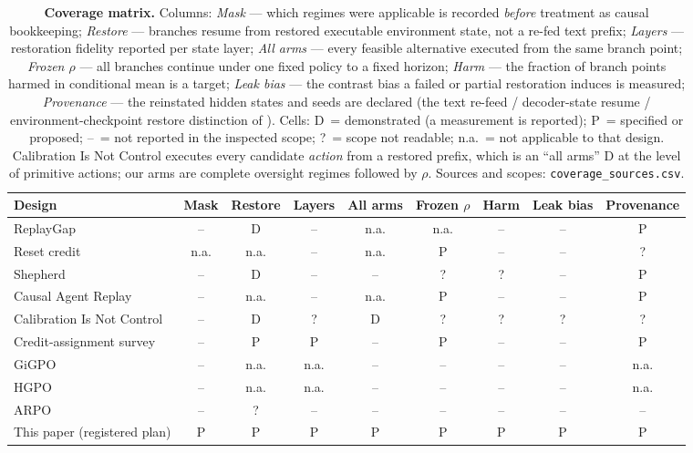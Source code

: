 \begin{table}[H]
\centering
\small
\setlength{\tabcolsep}{4pt}
\begin{tabular}{@{}lcccccccc@{}}
\toprule
Design & Mask & Restore & Layers & All arms & Frozen $\rho$ & Harm & Leak bias & Provenance \\
\midrule
ReplayGap \citep{replaygap2026} & -- & D & -- & n.a. & n.a. & -- & -- & P \\
Reset credit \citep{resetcredit2026} & n.a. & n.a. & -- & n.a. & P & -- & -- & ? \\
Shepherd \citep{shepherd2026} & -- & D & -- & -- & ? & ? & -- & P \\
Causal Agent Replay \citep{causalagentreplay2026} & -- & n.a. & -- & n.a. & P & -- & -- & P \\
Calibration Is Not Control \citep{calibrationnotcontrol2026} & -- & D & ? & D & ? & ? & ? & ? \\
Credit-assignment survey \citep{zhang2026ca} & -- & P & P & -- & P & -- & -- & P \\
GiGPO \citep{gigpo2025} & -- & n.a. & n.a. & -- & -- & -- & -- & n.a. \\
HGPO \citep{hgpo2026} & -- & n.a. & n.a. & -- & -- & -- & -- & n.a. \\
ARPO \citep{arpo2025} & -- & ? & -- & -- & -- & -- & -- & -- \\
This paper (registered plan) & P & P & P & P & P & P & P & P \\
\bottomrule
\end{tabular}
\caption{\textbf{Coverage matrix.}  Columns: \emph{Mask} --- which regimes were
applicable is recorded \emph{before} treatment as causal bookkeeping;
\emph{Restore} --- branches resume from restored executable environment state,
not a re-fed text prefix; \emph{Layers} --- restoration fidelity reported per
state layer; \emph{All arms} --- every feasible alternative executed from the
same branch point; \emph{Frozen $\rho$} --- all branches continue under one
fixed policy to a fixed horizon; \emph{Harm} --- the fraction of branch points
harmed in conditional mean is a target; \emph{Leak bias} --- the contrast bias
a failed or partial restoration induces is measured; \emph{Provenance} --- the
reinstated hidden states and seeds are declared (the text re-feed / decoder-state
resume / environment-checkpoint restore distinction of \citealp{zhang2026ca}).
Cells: D~= demonstrated (a measurement is reported); P~= specified or proposed;
--~= not reported in the inspected scope; ?~= scope not readable; n.a.~= not
applicable to that design.  Calibration Is Not Control executes every candidate
\emph{action} from a restored prefix, which is an ``all arms'' D at the level
of primitive actions; our arms are complete oversight regimes followed by
$\rho$.  Sources and scopes: \texttt{coverage\_sources.csv}.}
\label{tab:coverage}
\end{table}
